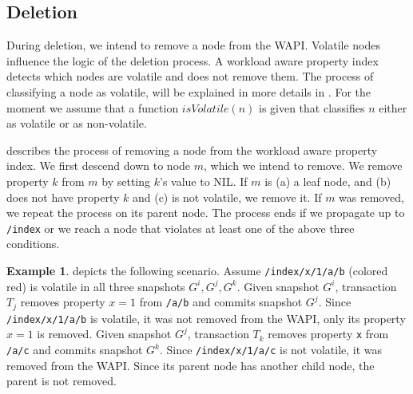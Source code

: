 \documentclass[abstracton,12pt]{scrartcl}
\theoremstyle{definition}
\newtheorem{example}{Example}
\begin{document}
\subsection{Deletion}

During deletion, we intend to remove a node from the WAPI.
Volatile nodes influence the logic of the deletion process.
A workload aware property index detects which nodes are volatile and does not remove them.
The process of classifying a node as volatile, will be explained in more details in .
For the moment we assume that a function $isVolatile(n)$ is given that classifies $n$ either as volatile or as non-volatile.

 describes the process of removing a node from the workload aware property index.
We first descend down to node $m$, which we intend to remove.
We remove property $k$ from $m$ by setting $k$'s value to \textsc{NIL}.
If $m$ is (a) a leaf node, and (b) does not have property $k$ and (c) is not volatile, we remove it.
If $m$ was removed, we repeat the process on its parent node.
The process ends if we propagate up to \texttt{/index} or we reach a node that violates at least one of the above three conditions.

\begin{example}
     depicts the following scenario.
    Assume \texttt{/index/x/1/a/b} (colored red) is volatile in all three snapshots $G^i, G^j, G^k$.
    Given snapshot $G^i$, transaction $T_j$ removes property $x=1$ from \texttt{/a/b} and commits snapshot $G^j$.
    Since \texttt{/index/x/1/a/b} is volatile, it was not removed from the WAPI, only its property $x=1$ is removed.
    Given snapshot $G^j$, transaction $T_k$ removes property \texttt{x} from \texttt{/a/c} and commits snapshot $G^k$.
    Since \texttt{/index/x/1/a/c} is not volatile, it was removed from the WAPI.
    Since its parent node has another child node, the parent is not removed.
\end{example}
\end{document}
